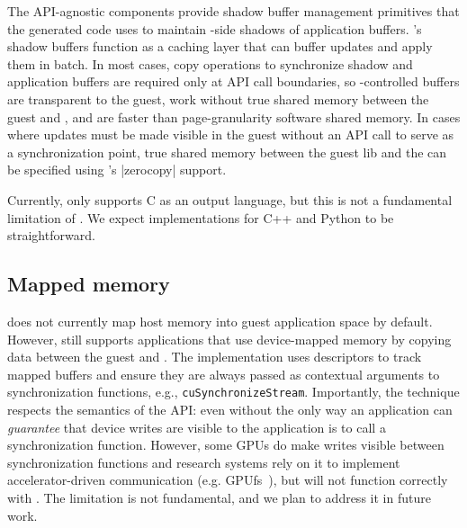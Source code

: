 {The \model API-agnostic components provide shadow buffer management primitives that the generated code uses to maintain \worker-side shadows of application buffers.
\model's shadow buffers function as a caching layer that can buffer updates and apply them in batch.
In most cases, copy operations to synchronize shadow and application buffers are required only at API call boundaries,
so \model-controlled buffers are transparent to the guest, work without true shared memory between the guest and \worker, and are faster than page-granularity software shared memory.
In cases where updates must be made visible in the guest without an API call to serve as a synchronization point,
true shared memory between the guest lib and the \worker can be specified using \speclang's \spec|zerocopy| support.

Currently, \compiler only supports C as an output language, but this is not a fundamental limitation of \model.
We expect implementations for C++ and Python to be straightforward.

\subsection{Mapped memory}
\label{s:api:mapped-mem}

\model does not currently map \worker host memory into guest application space by default.
However, \model still supports applications that use device-mapped memory by copying data between the guest and \worker.
The implementation uses \speclang descriptors to track mapped buffers and ensure they are always
passed as contextual arguments to synchronization functions, e.g., \lstinline|cuSynchronizeStream|.
Importantly, the technique respects the semantics of the API: even without \model the only way an application can
\emph{guarantee} that device writes are visible to the application is to call a synchronization function.
However, some GPUs do make writes visible between synchronization functions and
research systems rely on it to implement accelerator-driven communication (e.g. GPUfs~\cite{gpufs}),
but will not function correctly with \model. The limitation is not fundamental, and we plan to address
it in future work.

}
